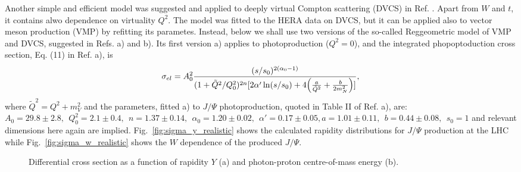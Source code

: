 \documentclass[12pt]{article}
\begin{document}
Another simple and efficient model was suggested and applied to deeply virtual Compton scattering (DVCS) in Ref. \cite{Capua}. Apart from $W$ and $t$, it contains alwo dependence on virtuality $Q^2$.
The model was fitted to the HERA data on DVCS, but it can be applied also to vector meson production (VMP) by refitting its parametes.
Instead, below we shall use two versions of the so-called Reggeometric model of VMP and DVCS, suggested in Refs. \cite{Fazio}a) and \cite{Fazio}b).
Its first version \cite{Fazio} a) applies to photoproduction ($Q^2=0$), and the integrated phopoptoduction cross section, Eq. (11) in Ref. \cite{Fazio}a), is
\begin{equation}
\sigma_{el}=A_0^2\frac{(s/s_0)^{2(\alpha_0-1)}}{(1+\tilde Q^2/Q^2_0)^{2n}[2\alpha'\ln(s/s_0)+4\Bigl(\frac{a}{\tilde Q^2}+\frac{b}{2m_N^2}\Bigr)]},
\end{equation}
where $\tilde Q^2=Q^2+m_V^2$ and the parameters, fitted \cite{Fazio}a) to $J/\Psi$ photoproduction, quoted in
Table II of Ref. \cite{Fazio}a), are: $A_0=29.8\pm 2.8,\ \ Q_0^2=2.1\pm 0.4,\ \ 
n=1.37\pm 0.14,\ \ \alpha_0 =1.20\pm 0.02,\ \ \alpha'=0.17\pm 0.05, a=1.01\pm 0.11,\ \ b=0.44\pm 0.08,\ \ s_0=1$ and relevant dimensions here again are implied.
Fig.~\ref{fig:sigma_y_realistic} shows the calculated rapidity distributions for $J/\Psi$ production at the LHC while Fig.~\ref{fig:sigma_w_realistic} shows the $W$ dependence of the produced $J/\Psi$.

\begin{figure}[!h]
  \centering
  \caption{Differential cross section as a function of rapidity $Y$ (a) and photon-proton centre-of-mass energy (b).}
\end{figure}
\end{document}

